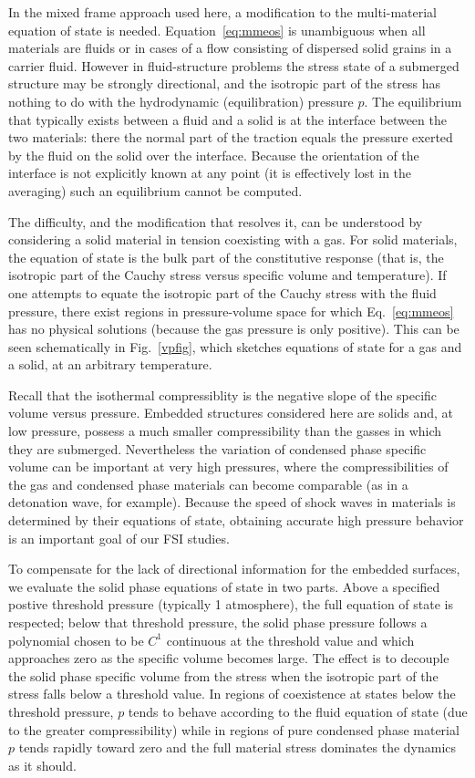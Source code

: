 In the mixed frame approach used here, a modification to the multi-material equation
of state is needed.  Equation~\ref{eq:mmeos} is unambiguous when all materials
are fluids or in cases of a flow consisting of dispersed solid
grains in a carrier fluid.  However in fluid-structure problems the stress
state of a submerged structure may be strongly directional, and the
isotropic part of the stress has nothing to do with the hydrodynamic
(equilibration) pressure $p$.  The equilibrium that typically exists between 
a fluid and a solid is at the interface between the two materials: there the 
normal part of the traction equals the pressure exerted by the fluid on the 
solid over the interface.  Because the orientation of the interface is not 
explicitly known at any point (it is effectively lost in the averaging) such 
an equilibrium cannot be computed.

The difficulty, and the modification that resolves it, can be understood by
considering a solid material in tension coexisting with a gas. 
For solid materials, the equation of state is the bulk part of the
constitutive response (that is, the isotropic part of the Cauchy stress versus
specific volume and temperature).  If one attempts to equate the isotropic
part of the Cauchy stress with the fluid pressure, there exist regions in
pressure-volume space for which Eq.~\ref{eq:mmeos} has no physical solutions
(because the gas pressure is only positive).  This can be seen schematically
in Fig.~\ref{vpfig}, which sketches equations of state for a gas and a 
solid, at an arbitrary temperature.

Recall that the isothermal compressiblity is the negative slope of
the specific volume versus pressure.  Embedded structures considered here are
solids and, at low pressure, possess a much smaller
compressibility than the gasses in which they are submerged.  
Nevertheless the variation of condensed phase specific volume can be important
at very high pressures, where the compressibilities of the gas and condensed
phase materials can become comparable (as in a detonation wave, for
example).  Because the speed of shock waves in materials is determined by
their equations of state, obtaining accurate high pressure behavior is an
important goal of our FSI studies.

To compensate for the lack of directional information for the embedded
surfaces, we evaluate the solid phase equations of state
in two parts.  Above a specified postive threshold pressure 
(typically 1 atmosphere), the full equation of state is respected; below that 
threshold pressure, the solid phase pressure follows a
polynomial chosen to be $C^1$ continuous at the threshold value and
which approaches zero as the specific volume becomes large.  The effect
is to decouple the solid phase specific volume from the stress
when the isotropic part of the stress falls below a threshold value.  In 
regions of coexistence at states below the threshold pressure, $p$ tends 
to behave according to the fluid equation of state (due to the greater 
compressibility) while in regions of pure condensed phase material $p$ tends 
rapidly toward zero and the full material stress dominates the dynamics as 
it should.

